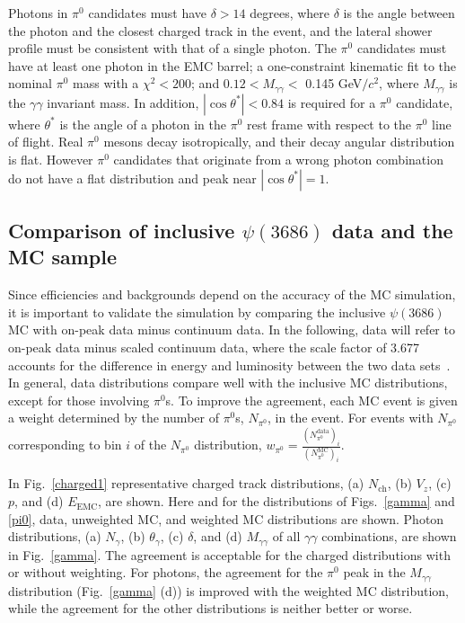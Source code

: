 \documentclass[aps,prd,twocolumn,showpacs,floatfix,byrevtex]{revtex4-1}
\begin{document}
Photons in $\pi^0$ candidates must have $\delta> 14$ degrees, where
$\delta$ is the angle between the photon and the closest charged track
in the event, and the lateral shower profile must be consistent with
that of a single photon.  The $\pi^0$ candidates must have at least
one photon in the EMC barrel; a one-constraint kinematic fit to the
nominal $\pi^0$ mass with a  $\chi^2 < 200$; and $ 0.12 <
M_{\gamma \gamma} < $ 0.145 GeV$/c^2$, where $M_{\gamma \gamma}$ is
the $\gamma \gamma$ invariant mass.  In addition, $|\cos \theta^*| <
0.84$ is required for a $\pi^0$ candidate, where $\theta^*$ is the
angle of a photon in the $\pi^0$ rest frame with respect to the
$\pi^0$ line of flight.  Real $\pi^0$ mesons decay isotropically, and
their decay angular distribution is flat. However $\pi^0$ candidates
that originate from a wrong photon combination do not have a flat
distribution and peak near $|\cos \theta^*| = 1$.%


\subsection{\boldmath Comparison of inclusive $\psi(3686)$ data and
  the MC sample}
\label{compare}
Since efficiencies and backgrounds depend on the accuracy of the MC
simulation, it is important to validate the simulation by comparing
the inclusive $\psi(3686)$ MC with on-peak data minus continuum data.
In the following, data will refer to on-peak data minus scaled
continuum data, where the scale factor of 3.677 accounts for the
difference in energy and luminosity between the two data
sets~\cite{Npsip}.  In general, data distributions compare well with
the inclusive MC distributions, except for those involving $\pi^0$s.
To improve the agreement, each MC event is given a weight determined
by the number of $\pi^0$s, $N_{\pi^0}$, in the event.  For events with
$N_{\pi^0}$ corresponding to bin $i$ of the $N_{\pi^0}$ distribution,
$w_{\pi^0} = \frac{(N_{\pi^0}^{\text{data}})_i}{(N_{\pi^0}^{\text{MC}})_i}$.

In Fig.~\ref{charged1} representative charged track distributions, (a)
$N_{\text{ch}}$, (b) $V_z$, (c) $p$, and (d) $E_{\text{EMC}}$, are
shown.  Here and for the distributions of Figs.~\ref{gamma} and
\ref{pi0}, data, unweighted MC, and weighted MC distributions are
shown. Photon distributions, (a) $N_{\gamma}$, (b) $\theta_{\gamma}$,
(c) $\delta$, and (d) $M_{\gamma \gamma}$ of all $\gamma \gamma$
combinations, are shown in Fig.~\ref{gamma}.  The agreement is
acceptable for the charged distributions with or without
weighting. For photons, the agreement for the $\pi^0$ peak in the
$M_{\gamma \gamma}$ distribution (Fig.~\ref{gamma} (d)) is improved
with the weighted MC distribution, while the agreement for the other
distributions is neither better or worse.
\end{document}
